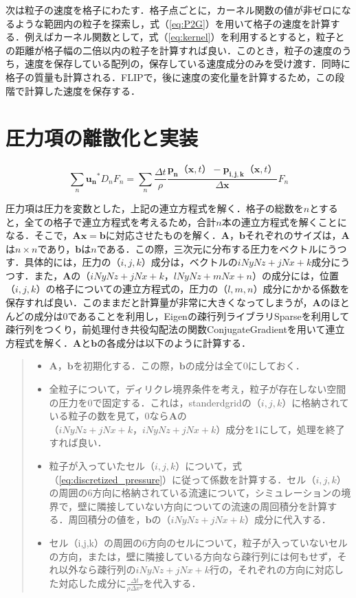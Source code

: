 \documentclass[a4j,12pt]{jreport}
\begin{document}
次は粒子の速度を格子にわたす．格子点ごとに，カーネル関数の値が非ゼロになるような範囲内の粒子を探索し，式（\ref{eq:P2G}）を用いて格子の速度を計算する．例えばカーネル関数として，式（\ref{eq:kernel}）を利用するとすると，粒子との距離が格子幅の二倍以内の粒子を計算すれば良い．このとき，粒子の速度のうち，速度を保存している配列の，保存している速度成分のみを受け渡す．同時に格子の質量も計算される．FLIPで，後に速度の変化量を計算するため，この段階で計算した速度を保存する．

\section{圧力項の離散化と実装} \label{sec:Imppressure}
\begin{equation}
\sum_{n}\bm{u_n}^*D_nF_n= \sum_{n}\frac{\varDelta t}{\rho}\frac{\bm{p_n}（\bm{x},t） - \bm{p_{i,j,k}}（\bm{x},t）}{\varDelta \bm{x}}F_n
\end{equation}

圧力項は圧力を変数とした，上記の連立方程式を解く．格子の総数を$n$とすると，全ての格子で連立方程式を考えるため，合計$n$本の連立方程式を解くことになる．そこで，$\bm{Ax=b}$に対応させたものを解く．$\bm{A}$，$\bm{b}$それぞれのサイズは，$\bm{A}$は$n \times n$であり，$\bm{b}$は$n$である．この際，三次元に分布する圧力をベクトルにうつす．具体的には，圧力の$（i,j,k）$成分は，ベクトルの$iNyNz+jNx+k$成分にうつす．また，$\bm{A}$の$（iNyNz+jNx+k，lNyNz+mNx+n）$の成分には，位置$（i,j,k）$の格子についての連立方程式の，圧力の$（l,m,n）$成分にかかる係数を保存すれば良い．このままだと計算量が非常に大きくなってしまうが，$\bm{A}$のほとんどの成分は$0$であることを利用し，Eigenの疎行列ライブラリSparseを利用して疎行列をつくり，前処理付き共役勾配法の関数ConjugateGradientを用いて連立方程式を解く．$\bm{A}$と$\bm{b}$の各成分は以下のように計算する．
\begin{quote}
	\begin{itemize}
		\item $\bm{A}$，$\bm{b}$を初期化する．この際，$\bm{b}$の成分は全て0にしておく．
		\item 全粒子について，ディリクレ境界条件を考え，粒子が存在しない空間の圧力を$0$で固定する．これは，standerdgridの$（i,j,k）$に格納されている粒子の数を見て，0なら$\bm{A}$の$（iNyNz+jNx+k，iNyNz+jNx+k）$成分を1にして，処理を終了すれば良い．
		\item 粒子が入っていたセル$（i,j,k）$について，式（\ref{eq:discretized_pressure}）に従って係数を計算する．セル$（i,j,k）$の周囲の6方向に格納されている流速について，シミュレーションの境界で，壁に隣接していない方向についての流速の周回積分を計算する．周回積分の値を，$\bm{b}$の$（iNyNz+jNx+k）$成分に代入する．
		\item セル（i,j,k）の周囲の6方向のセルについて，粒子が入っていないセルの方向，または，壁に隣接している方向なら疎行列には何もせず，それ以外なら疎行列の$iNyNz+jNx+k$行の，それぞれの方向に対応した対応した成分に$\frac{\varDelta t}{\rho\varDelta x^2}$を代入する．
	\end{itemize}
\end{quote}
\end{document}
